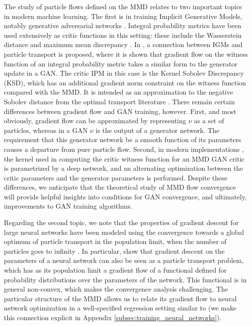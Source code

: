 The study of particle flows defined on the MMD relates to two important topics in modern machine learning. The first is in training Implicit Generative Models, notably generative adversarial networks \cite{gans}.  Integral probability metrics have been used extensively as critic functions in this setting: these include the Wasserstein distance \cite{towards-principled-gans,wgan-gp,sinkhorn-igm} and maximum mean discrepancy \cite{gen-mmd,Li:2015,Li:2017a,cramer-gan,Binkowski:2018,Arbel:2018}.  In \cite[Section 3.3]{Mroueh:2019}, a connection between IGMs and particle transport is proposed, where it is shown that gradient flow on the witness function of an integral probability metric takes a similar form to the generator update in a GAN. The critic IPM in this case is the Kernel Sobolev Discrepancy (KSD), which has an additional gradient norm constraint on the witness function compared with the MMD. It is intended as an approximation to the negative Sobolev distance from the optimal transport literature \cite{Otto:2000,Villani:2009,Peyre:2011}.  There remain certain differences between gradient flow and GAN training, however.  First, and most obviously, gradient flow can be approximated by representing $\nu$ as a set of particles, whereas in a GAN $\nu$ is the output of a generator network. The requirement that this generator network be a smooth function of its parameters causes a departure from pure particle flow. Second, in modern implementations \cite{Li:2017a,Binkowski:2018,Arbel:2018}, the kernel used in computing the critic witness function for an MMD GAN critic is parametrized by a deep network, and an alternating optimization between the critic parameters and the generator parameters is performed. Despite these differences, we anticipate that the theoretical study of MMD flow convergence will provide helpful insights into conditions for GAN convergence, and ultimately, improvements to GAN training algorithms.

Regarding the second topic, we note that the properties of gradient descent for large neural networks
have been modeled using the convergence towards a global optimum of particle transport in the population limit, when the number of particles goes to infinity  \cite{rotskoff2018neural,chizat2018global,mei2018mean,sirignano2018mean}. 
In particular, \cite{rotskoff2019global} show that gradient descent on the parameters of a neural network can also be seen as a particle transport problem, which has as its population limit a gradient flow of a  functional defined for probability distributions over the parameters of the network. 
This functional is in general non-convex, which makes the convergence analysis challenging.
The particular structure of the MMD allows us to relate its gradient flow to neural network optimization in a well-specified regression setting similar to \cite{rotskoff2019global} (we make this connection explicit in Appendix \ref{subsec:training_neural_networks}).

